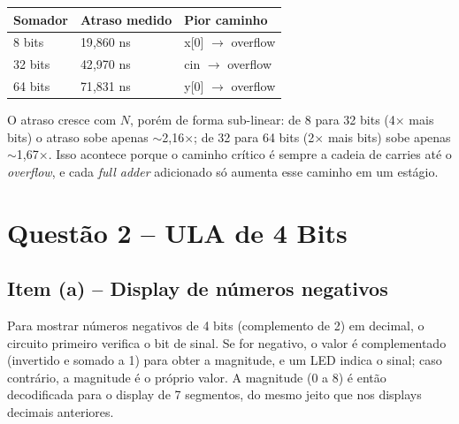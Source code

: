 \documentclass[report, 12pt]{uftreport}
\begin{document}
\begin{center}
\begin{tabular}{lll}
\toprule
Somador & Atraso medido & Pior caminho \\
\midrule
8 bits  & 19{,}860 ns & x[0] $\rightarrow$ overflow \\
32 bits & 42{,}970 ns & cin $\rightarrow$ overflow \\
64 bits & 71{,}831 ns & y[0] $\rightarrow$ overflow \\
\bottomrule
\end{tabular}
\end{center}

O atraso cresce com $N$, porém de forma sub-linear: de 8 para 32 bits (4$\times$ mais bits) o atraso sobe apenas $\sim$2,16$\times$; de 32 para 64 bits (2$\times$ mais bits) sobe apenas $\sim$1,67$\times$. Isso acontece porque o caminho crítico é sempre a cadeia de carries até o \textit{overflow}, e cada \textit{full adder} adicionado só aumenta esse caminho em um estágio.


\chapter{Questão 2 -- ULA de 4 Bits}

\section{Item (a) -- Display de números negativos}

Para mostrar números negativos de 4 bits (complemento de 2) em decimal, o circuito primeiro verifica o bit de sinal. Se for negativo, o valor é complementado (invertido e somado a 1) para obter a magnitude, e um LED indica o sinal; caso contrário, a magnitude é o próprio valor. A magnitude (0 a 8) é então decodificada para o display de 7 segmentos, do mesmo jeito que nos displays decimais anteriores.
\end{document}
